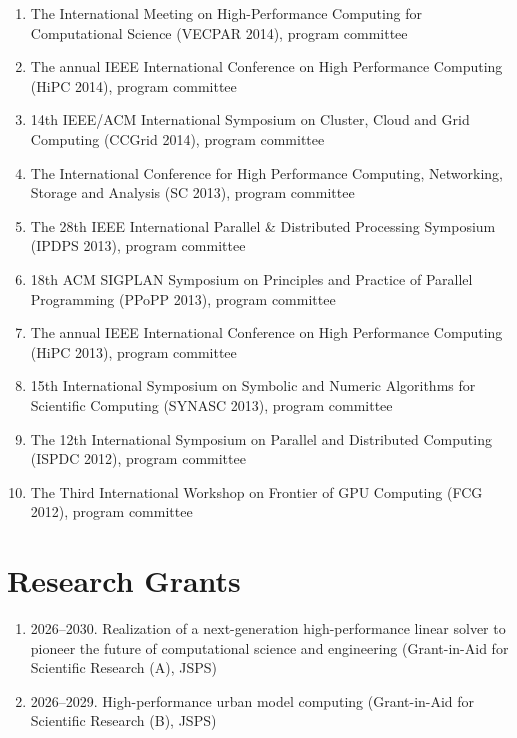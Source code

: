 \documentclass[margin,line]{cv}
\begin{document}
\begin{resume}
\begin{enumerate}
\item The International Meeting on High-Performance Computing for Computational Science (VECPAR 2014), program committee

\item The annual IEEE International Conference on High Performance Computing (HiPC 2014), program committee

\item 14th IEEE/ACM International Symposium on Cluster, Cloud and Grid Computing (CCGrid 2014), program committee

\item The International Conference for High Performance Computing, Networking, Storage and Analysis (SC 2013), program committee

\item The 28th IEEE International Parallel \& Distributed Processing Symposium (IPDPS 2013), program committee

\item 18th ACM SIGPLAN Symposium on Principles and Practice of Parallel Programming (PPoPP 2013), program committee

\item The annual IEEE International Conference on High Performance Computing (HiPC 2013), program committee

\item 15th International Symposium on Symbolic and Numeric Algorithms for Scientific Computing (SYNASC 2013), program committee

\item The 12th International Symposium on Parallel and Distributed Computing (ISPDC 2012), program committee

\item The Third International Workshop on Frontier of GPU Computing (FCG 2012), program committee

\end{enumerate}

\section{\sc Research Grants}
\begin{enumerate}
\item 2026--2030. Realization of a next-generation high-performance linear solver to pioneer the future of computational science and engineering (Grant-in-Aid for Scientific Research (A), JSPS)

\item 2026--2029. High-performance urban model computing (Grant-in-Aid for Scientific Research (B), JSPS)


\end{enumerate}
\end{resume}
\end{document}
